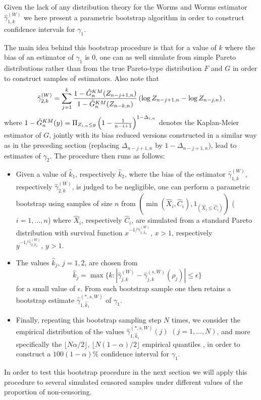 Given the lack of any distribution theory for the Worms and Worms estimator $\hat{\gamma}_{1,k}^{(W)}$ we here present a parametric bootstrap algorithm in order to construct confidence intervals for $\gamma_1$. 

\vspace{0.3cm} The main idea behind this bootstrap procedure is that for a value of $k$ where the bias of an estimator of $\gamma_1$ is 0, one can as well simulate from simple Pareto distributions rather than from the true Pareto-type distribution $F$ and $G$ in order to construct samples of estimators. Also note that 
$$
\hat{\gamma}_{2,k}^{(W)} = \sum_{j=1}^k {1-\hat{G}^{KM}_n (Z_{n-j+1,n}) \over 1-\hat{G}^{KM}_n (Z_{n-k,n})} \left( \log Z_{n-j+1,n}-\log Z_{n-j,n}\right), 
$$
where $1-\hat{G}^{KM}_n (y)= \Pi_{Z_{i,n} \leq y} \left(1- {1 \over n-i+1} \right)^{1-\Delta_{i,n}}$ denotes the Kaplan-Meier estimator of $G$, jointly with its bias reduced versions constructed in a similar way as in the preceding section (replacing $\Delta_{n-j+1,n}$ by $1-\Delta_{n-j+1,n}$), lead to estimates of $\gamma_2$. The procedure then runs as follows:
\begin{itemize} 
\item
Given a value of $\hat{k}_1$, respectively $\hat{k}_2$, where the bias of the estimator $\hat{\gamma}_{1,k}^{(W)}$, respectively $\hat{\gamma}_{2,k}^{(W)}$, is judged to be negligible,
one can perform a parametric bootstrap using samples of size $n$ from 
$\left( \min(\hat{X}_i, \hat{C}_i),1_{(\hat{X}_i \leq \hat{C}_i)}\right)$ ($i=1,\ldots,n$) where $\hat{X}_i$, respectively $\hat{C}_i$, are simulated from a standard Pareto distribution with survival function $x^{-1/\hat{\gamma}_{1,\hat{k}_1}^{(W)}}, \, x>1$, respectively $y^{-1/\hat{\gamma}_{2,\hat{k}_2}^{(W)}}, \,y>1$. 
\item
The values $\hat{k}_j$, $j=1,2$, are chosen from 
$$
\hat{k}_j = \max \{k: |\hat{\gamma}_{j,k}^{(W)}-\hat{\gamma}_{j,k}^{(s,W)}(\rho_j)| \leq \epsilon \}
$$ for a small value of $\epsilon$.
\itemur
From each bootstrap sample one then retains a bootstrap estimate $\hat{\gamma}_{1,\hat{k}_1}^{(*,s,W)}$ of $\gamma_1$. 
\item
Finally, repeating this bootstrap sampling step $N$ times, we consider the empirical distribution of the values $\hat{\gamma}_{1,\hat{k}_1}^{(*,s,W)}(j)$ $(j=1,\ldots,N)$, and more specifically the $\lfloor N\alpha/2 \rfloor$, $\lfloor N(1-\alpha)/2 \rfloor$ empirical quantiles , in order to construct a $100(1-\alpha)\%$ confidence interval for $\gamma_1$.
\end{itemize}
In order to test this bootstrap procedure in the next section we will apply this procedure to several simulated censored samples under different values of the proportion of non-censoring.

